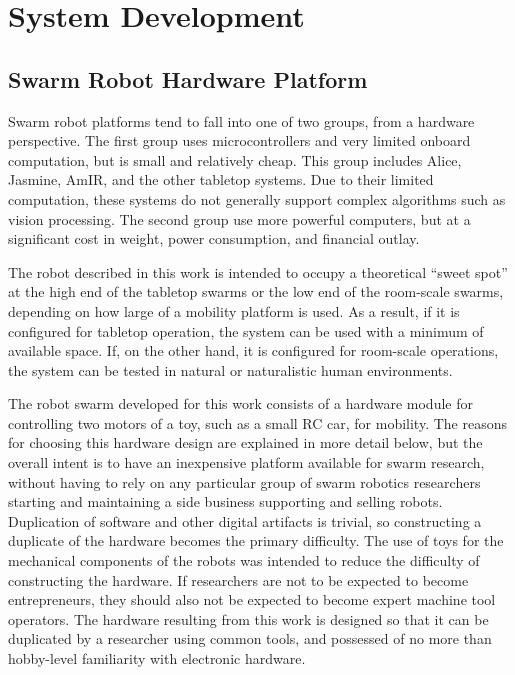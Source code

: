 \chapter{System Development}

\section{Swarm Robot Hardware Platform}

Swarm robot platforms tend to fall into one of two groups, from a hardware perspective. 
The first group uses microcontrollers and very limited onboard computation, but is small and relatively cheap.
This group includes Alice, Jasmine, AmIR, and the other tabletop systems. 
Due to their limited computation, these systems do not generally support complex algorithms such as vision processing. 
The second group use more powerful computers, but at a significant cost in weight, power consumption, and financial outlay.

The robot described in this work is intended to occupy a theoretical ``sweet spot'' at the high end of the tabletop swarms or the low end of the room-scale swarms, depending on how large of a mobility platform is used. 
As a result, if it is configured for tabletop operation, the system can be used with a minimum of available space. 
If, on the other hand, it is configured for room-scale operations, the system can be tested in natural or naturalistic human environments. 

The robot swarm developed for this work consists of a hardware module for controlling two motors of a toy, such as a small RC car, for mobility. 
The reasons for choosing this hardware design are explained in more detail below, but the overall intent is to have an inexpensive platform available for swarm research, without having to rely on any particular group of swarm robotics researchers starting and maintaining a side business supporting and selling robots.
Duplication of software and other digital artifacts is trivial, so constructing a duplicate of the hardware becomes the primary difficulty. 
The use of toys for the mechanical components of the robots was intended to reduce the difficulty of constructing the hardware. 
If researchers are not to be expected to become entrepreneurs, they should also not be expected to become expert machine tool operators.
The hardware resulting from this work is designed so that it can be duplicated by a researcher using common tools, and possessed of no more than hobby-level familiarity with electronic hardware.

